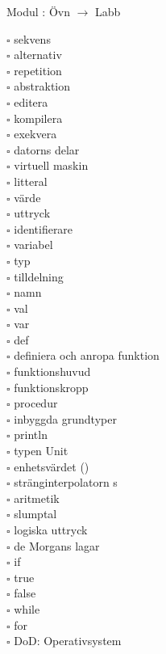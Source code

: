 
    Modul : Övn  $\rightarrow$ Labb 
    \begin{multicols}{3}\SlideFontTiny
    $\square$ sekvens \\
$\square$ alternativ \\
$\square$ repetition \\
$\square$ abstraktion \\
$\square$ editera \\
$\square$ kompilera \\
$\square$ exekvera \\
$\square$ datorns delar \\
$\square$ virtuell maskin \\
$\square$ litteral \\
$\square$ värde \\
$\square$ uttryck \\
$\square$ identifierare \\
$\square$ variabel \\
$\square$ typ \\
$\square$ tilldelning \\
$\square$ namn \\
$\square$ val \\
$\square$ var \\
$\square$ def \\
$\square$ definiera och anropa funktion \\
$\square$ funktionshuvud \\
$\square$ funktionskropp \\
$\square$ procedur \\
$\square$ inbyggda grundtyper \\
$\square$ println \\
$\square$ typen Unit \\
$\square$ enhetsvärdet () \\
$\square$ stränginterpolatorn s \\
$\square$ aritmetik \\
$\square$ slumptal \\
$\square$ logiska uttryck \\
$\square$ de Morgans lagar \\
$\square$ if \\
$\square$ true \\
$\square$ false \\
$\square$ while \\
$\square$ for \\
$\square$ DoD: Operativsystem \\
    \end{multicols}
    